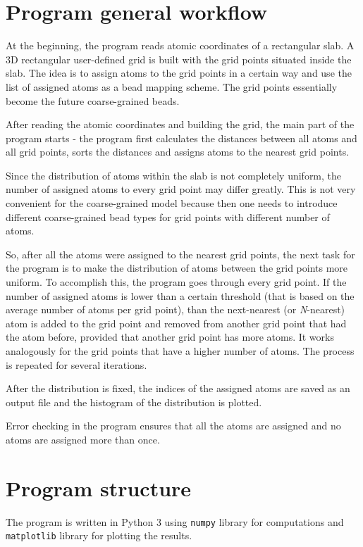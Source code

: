 \documentclass[11pt]{article}
\begin{document}
\section{Program general workflow}

At the beginning, the program reads atomic coordinates of a rectangular slab. A 3D rectangular user-defined grid is built with the grid points situated inside the slab. The idea is to assign atoms to the grid points in a certain way and use the list of assigned atoms as a bead mapping scheme. The grid points essentially become the future coarse-grained beads.

After reading the atomic coordinates and building the grid, the main part of the program starts - the program first calculates the distances between all atoms and all grid points, sorts the distances and assigns atoms to the nearest grid points.

Since the distribution of atoms within the slab is not completely uniform, the number of assigned atoms to every grid point may differ greatly. This is not very convenient for the coarse-grained model because then one needs to introduce different coarse-grained bead types for grid points with different number of atoms.

So, after all the atoms were assigned to the nearest grid points, the next task for the program is to make the distribution of atoms between the grid points more uniform. To accomplish this, the program goes through every grid point. If the number of assigned atoms is lower than a certain threshold (that is based on the average number of atoms per grid point), than the next-nearest (or \textit{N}-nearest) atom is added to the grid point and removed from another grid point that had the atom before, provided that another grid point has more atoms. It works analogously for the grid points that have a higher number of atoms. The process is repeated for several iterations.

After the distribution is fixed, the indices of the assigned atoms are saved as an output file and the histogram of the distribution is plotted.

Error checking in the program ensures that all the atoms are assigned and no atoms are assigned more than once.

\section{Program structure}

The program is written in Python 3 using \texttt{numpy} library for computations and \texttt{matplotlib} library for plotting the results.
\end{document}
